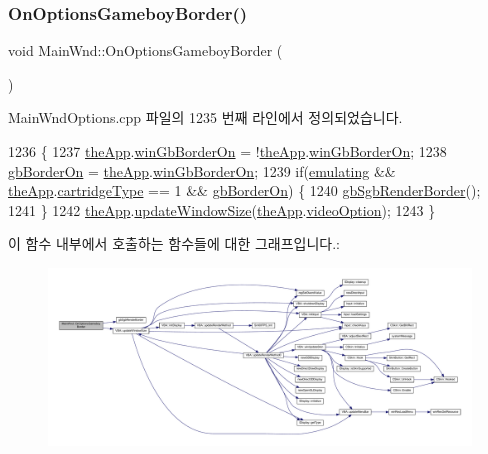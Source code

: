 \subsubsection{\texorpdfstring{On\+Options\+Gameboy\+Border()}{OnOptionsGameboyBorder()}}
{\footnotesize\ttfamily void Main\+Wnd\+::\+On\+Options\+Gameboy\+Border (\begin{DoxyParamCaption}{ }\end{DoxyParamCaption})\hspace{0.3cm}{\ttfamily [protected]}}



Main\+Wnd\+Options.\+cpp 파일의 1235 번째 라인에서 정의되었습니다.


\begin{DoxyCode}
1236 \{
1237   \mbox{\hyperlink{_v_b_a_8cpp_a8095a9d06b37a7efe3723f3218ad8fb3}{theApp}}.\mbox{\hyperlink{class_v_b_a_afacb46f54fb546d8d97055dc535b074e}{winGbBorderOn}} = !\mbox{\hyperlink{_v_b_a_8cpp_a8095a9d06b37a7efe3723f3218ad8fb3}{theApp}}.\mbox{\hyperlink{class_v_b_a_afacb46f54fb546d8d97055dc535b074e}{winGbBorderOn}};
1238   \mbox{\hyperlink{gb_globals_8cpp_a4700c36a68a6b63f7c2e91756a250cd2}{gbBorderOn}} = \mbox{\hyperlink{_v_b_a_8cpp_a8095a9d06b37a7efe3723f3218ad8fb3}{theApp}}.\mbox{\hyperlink{class_v_b_a_afacb46f54fb546d8d97055dc535b074e}{winGbBorderOn}};
1239   \textcolor{keywordflow}{if}(\mbox{\hyperlink{_main_wnd_options_8cpp_af9cc36078b1b311753963297ae7f2a74}{emulating}} && \mbox{\hyperlink{_v_b_a_8cpp_a8095a9d06b37a7efe3723f3218ad8fb3}{theApp}}.\mbox{\hyperlink{class_v_b_a_af300759fcbc7eeb00ce73f956fc5ddb7}{cartridgeType}} == 1 && 
      \mbox{\hyperlink{gb_globals_8cpp_a4700c36a68a6b63f7c2e91756a250cd2}{gbBorderOn}}) \{
1240     \mbox{\hyperlink{_g_b_8h_af317983dce6743159185981f1f84e782}{gbSgbRenderBorder}}();
1241   \}
1242   \mbox{\hyperlink{_v_b_a_8cpp_a8095a9d06b37a7efe3723f3218ad8fb3}{theApp}}.\mbox{\hyperlink{class_v_b_a_ac278ece4958310ce2ef8751afbad08f3}{updateWindowSize}}(\mbox{\hyperlink{_v_b_a_8cpp_a8095a9d06b37a7efe3723f3218ad8fb3}{theApp}}.\mbox{\hyperlink{class_v_b_a_a17dac073149c897f770c00ed7098ad32}{videoOption}});
1243 \}
\end{DoxyCode}
이 함수 내부에서 호출하는 함수들에 대한 그래프입니다.\+:
\nopagebreak
\begin{figure}[H]
\begin{center}
\leavevmode
\includegraphics[width=350pt]{class_main_wnd_a8fce3257c75cb141371c422adbcb5fd1_cgraph}
\end{center}
\end{figure}
